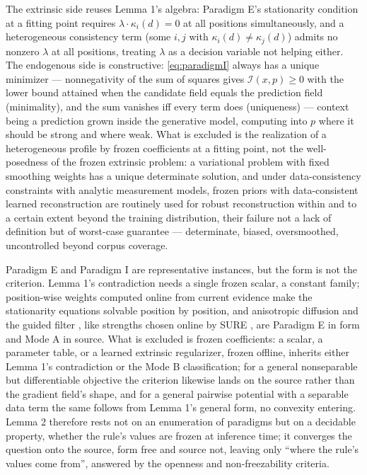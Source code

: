 \argument The extrinsic side reuses Lemma 1's algebra: Paradigm E's stationarity condition at a fitting point requires $\lambda \cdot \kappa_i (d) = 0$ at all positions simultaneously, and a heterogeneous consistency term (some $i, j$ with $\kappa_i (d) \neq \kappa_j (d)$) admits no nonzero $\lambda$ at all positions, treating $\lambda$ as a decision variable not helping either. The endogenous side is constructive: \eqref{eq:paradigmI} always has a unique minimizer --- nonnegativity of the sum of squares gives $\mathcal{I}(x, p) \ge 0$ with the lower bound attained when the candidate field equals the prediction field (minimality), and the sum vanishes iff every term does (uniqueness) --- context being a prediction grown inside the generative model, computing into $p$ where it should be strong and where weak. What is excluded is the realization of a heterogeneous profile by frozen coefficients at a fitting point, not the well-posedness of the frozen extrinsic problem: a variational problem with fixed smoothing weights has a unique determinate solution, and under data-consistency constraints with analytic measurement models, frozen priors with data-consistent learned reconstruction \citep{haltmeier2026} are routinely used for robust reconstruction within and to a certain extent beyond the training distribution, their failure not a lack of definition but of worst-case guarantee --- determinate, biased, oversmoothed, uncontrolled beyond corpus coverage.\qedbox

Paradigm E and Paradigm I are representative instances, but the form is not the criterion. Lemma 1's contradiction needs a single frozen scalar, a constant family; position-wise weights computed online from current evidence make the stationarity equations solvable position by position, and anisotropic diffusion and the guided filter \citep{perona1990,he2013}, like strengths chosen online by SURE \citep{stein1981}, are Paradigm E in form and Mode A in source. What is excluded is frozen coefficients: a scalar, a parameter table, or a learned extrinsic regularizer, frozen offline, inherits either Lemma 1's contradiction or the Mode B classification; for a general nonseparable but differentiable objective the criterion likewise lands on the source rather than the gradient field's shape, and for a general pairwise potential with a separable data term the same follows from Lemma 1's general form, no convexity entering. Lemma 2 therefore rests not on an enumeration of paradigms but on a decidable property, whether the rule's values are frozen at inference time; it converges the question onto the source, form free and source not, leaving only ``where the rule's values come from'', answered by the openness and non-freezability criteria.

